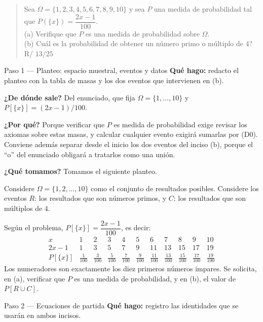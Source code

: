 \documentclass[11pt]{article}
\begin{document}
\begin{quote}
Sea $\Omega=\{1,2,3,4,5,6,7,8,9,10\}$ y sea $P$ una medida de probabilidad tal que
$P(\{x\})=\dfrac{2x-1}{100}$.\\
(a) Verifique que $P$ es una medida de probabilidad sobre $\Omega$.\\
(b) Cuál es la probabilidad de obtener un número primo o múltiplo de 4? \hfill R/ $13/25$
\end{quote}

\begin{sol}

\begin{paso}{Paso 1 --- Planteo: espacio muestral, eventos y datos}
\textbf{Qué hago:} redacto el planteo con la tabla de masas y los dos eventos que intervienen en
(b).

\textbf{¿De dónde sale?} Del enunciado, que fija $\Omega=\{1,\dots,10\}$ y
$P[\{x\}]=(2x-1)/100$.

\textbf{¿Por qué?} Porque verificar que $P$ es medida de probabilidad exige revisar los axiomas
sobre estas masas, y calcular cualquier evento exigirá sumarlas por (D0). Conviene además
separar desde el inicio los dos eventos del inciso (b), porque el ``o'' del enunciado obligará a
tratarlos como una unión.

\textbf{¿Qué tomamos?} Tomamos el siguiente planteo.

\medskip
Considere $\Omega=\{1,2,\dots,10\}$ como el conjunto de resultados posibles. Considere los
eventos $R$: los resultados que son números primos, y $C$: los resultados que son múltiplos
de $4$.

Según el problema, $P[\{x\}]=\dfrac{2x-1}{100}$, es decir:
\[
\begin{array}{c|cccccccccc}
x & 1 & 2 & 3 & 4 & 5 & 6 & 7 & 8 & 9 & 10\\\hline
2x-1 & 1 & 3 & 5 & 7 & 9 & 11 & 13 & 15 & 17 & 19\\[2pt]
P[\{x\}] & \frac{1}{100} & \frac{3}{100} & \frac{5}{100} & \frac{7}{100} & \frac{9}{100}
& \frac{11}{100} & \frac{13}{100} & \frac{15}{100} & \frac{17}{100} & \frac{19}{100}
\end{array}
\]
Los numeradores son exactamente los diez primeros números impares. Se solicita, en (a),
verificar que $P$ es una medida de probabilidad, y en (b), el valor de $P[R\cup C]$.
\end{paso}

\begin{paso}{Paso 2 --- Ecuaciones de partida}
\textbf{Qué hago:} registro las identidades que se usarán en ambos incisos.


\end{paso}
\end{sol}
\end{document}
